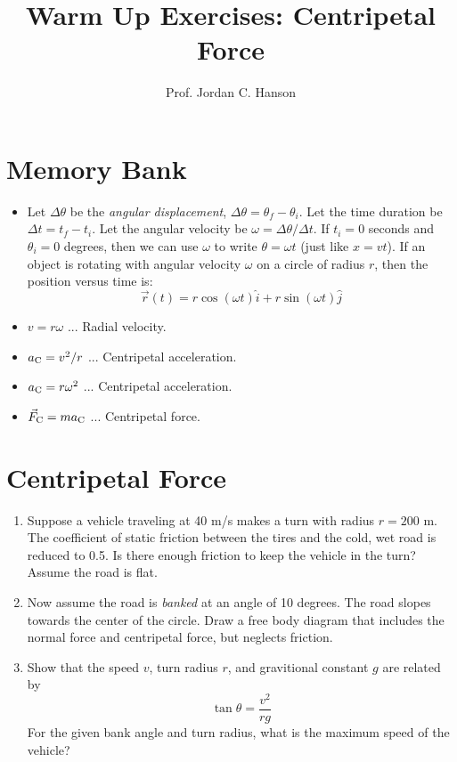 \documentclass{article}
\begin{document}
\title{Warm Up Exercises: Centripetal Force}
\author{Prof. Jordan C. Hanson}

\maketitle

\section{Memory Bank}

\begin{itemize}
\item Let $\Delta\theta$ be the \textit{angular displacement}, $\Delta\theta = \theta_f - \theta_i$.  Let the time duration be $\Delta t = t_f - t_i$.  Let the angular velocity be $\omega = \Delta \theta / \Delta t$.  If $t_i = 0$ seconds and $\theta_i = 0$ degrees, then we can use $\omega$ to write $\theta = \omega t$ (just like $x = v t$).  If an object is rotating with angular velocity $\omega$ on a circle of radius $r$, then the position versus time is:
\begin{equation}
\vec{r}(t) = r\cos(\omega t)\hat{i} + r\sin(\omega t)\hat{j} \label{eq:1}
\end{equation}
\item $v = r\omega$ ... Radial velocity.
\item $a_{\rm C} = v^2/r$ ... Centripetal acceleration.
\item $a_{\rm C} = r \omega^2$ ... Centripetal acceleration.
\item $\vec{F}_{\rm C} = m a_{\rm C}$ ... Centripetal force.
\end{itemize}

\section{Centripetal Force}
\begin{enumerate}
\item Suppose a vehicle traveling at 40 m/s makes a turn with radius $r = 200$ m.  The coefficient of static friction between the tires and the cold, wet road is reduced to 0.5.  Is there enough friction to keep the vehicle in the turn?  Assume the road is flat. \\ \vspace{2cm}
\item Now assume the road is \textit{banked} at an angle of 10 degrees.  The road slopes towards the center of the circle.  Draw a free body diagram that includes the normal force and centripetal force, but neglects friction. \\ \vspace{2cm}
\item Show that the speed $v$, turn radius $r$, and gravitional constant $g$ are related by
\begin{equation}
\tan\theta = \frac{v^2}{r g}
\end{equation}
For the given bank angle and turn radius, what is the maximum speed of the vehicle?
\end{enumerate}
\end{document}
